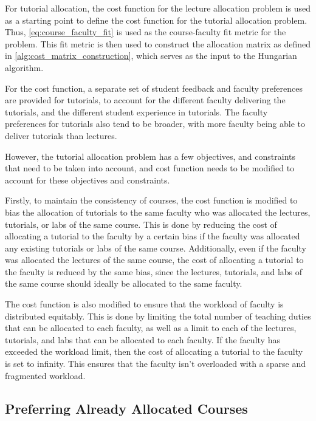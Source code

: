 For tutorial allocation, the cost function for the lecture allocation problem is used as a starting point to define the cost function for the tutorial allocation problem. Thus, \autoref{eq:course_faculty_fit} is used as the course-faculty fit metric for the problem. This fit metric is then used to construct the allocation matrix as defined in \autoref{alg:cost_matrix_construction}, which serves as the input to the Hungarian algorithm.

For the cost function, a separate set of student feedback and faculty preferences are provided for tutorials, to account for the different faculty delivering the tutorials, and the different student experience in tutorials. The faculty preferences for tutorials also tend to be broader, with more faculty being able to deliver tutorials than lectures.

However, the tutorial allocation problem has a few objectives, and constraints that need to be taken into account, and cost function needs to be modified to account for these objectives and constraints.

Firstly, to maintain the consistency of courses, the cost function is modified to bias the allocation of tutorials to the same faculty who was allocated the lectures, tutorials, or labs of the same course. This is done by reducing the cost of allocating a tutorial to the faculty by a certain bias if the faculty was allocated any existing tutorials or labs of the same course. Additionally, even if the faculty was allocated the lectures of the same course, the cost of allocating a tutorial to the faculty is reduced by the same bias, since the lectures, tutorials, and labs of the same course should ideally be allocated to the same faculty.

The cost function is also modified to ensure that the workload of faculty is distributed equitably. This is done by limiting the total number of teaching duties that can be allocated to each faculty, as well as a limit to each of the lectures, tutorials, and labs that can be allocated to each faculty. If the faculty has exceeded the workload limit, then the cost of allocating a tutorial to the faculty is set to infinity. This ensures that the faculty isn't overloaded with a sparse and fragmented workload.

\subsection{Preferring Already Allocated Courses}

